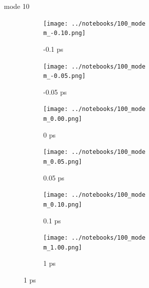 \documentclass{beamer}
\begin{document}
\renewcommand\m{10}
\begin{frame}{mode \m}
	\begin{figure}
		\centering
		\begin{subfigure}[b]{\w\textwidth}
			\centering
			\texttt{[image: ../notebooks/100\_mode\\m\_-0.10.png]}
			\caption{-0.1 ps}
		\end{subfigure}
		\begin{subfigure}[b]{\w\textwidth}
			\centering
			\texttt{[image: ../notebooks/100\_mode\\m\_-0.05.png]}
			\caption{-0.05 ps}
		\end{subfigure}
		\begin{subfigure}[b]{\w\textwidth}
			\centering
			\texttt{[image: ../notebooks/100\_mode\\m\_0.00.png]}
			\caption{0 ps}
		\end{subfigure}
		\begin{subfigure}[b]{\w\textwidth}
			\centering
			\texttt{[image: ../notebooks/100\_mode\\m\_0.05.png]}
			\caption{0.05 ps}
		\end{subfigure}
		\begin{subfigure}[b]{\w\textwidth}
			\centering
			\texttt{[image: ../notebooks/100\_mode\\m\_0.10.png]}
			\caption{0.1 ps}
		\end{subfigure}
		\begin{subfigure}[b]{\w\textwidth}
			\centering
			\texttt{[image: ../notebooks/100\_mode\\m\_1.00.png]}
			\caption{1 ps}
		\end{subfigure}
	\end{figure}
\end{frame}
\end{document}
